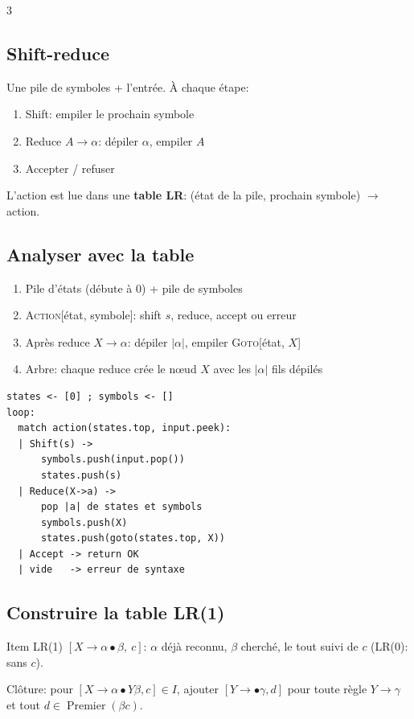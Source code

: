 \documentclass[12pt, a4paper]{article}
\newcommand{\Prem}{\operatorname{Premier}}
\begin{document}
\begin{multicols*}{3}
	\subsection{Shift-reduce}
	Une pile de symboles + l'entrée. À chaque étape:
	\begin{enumerate}[\roman*.]
		\item Shift: empiler le prochain symbole
		\item Reduce $A\rightarrow\alpha$: dépiler $\alpha$, empiler $A$
		\item Accepter / refuser
	\end{enumerate}
	L'action est lue dans une \textbf{table LR}: (état de la pile, prochain symbole) $\rightarrow$ action.
 
	\subsection{Analyser avec la table}
	\begin{enumerate}[\roman*.]
		\item Pile d'états (débute à $0$) + pile de symboles
		\item \textsc{Action}[état, symbole]: shift $s$, reduce, accept ou erreur
		\item Après reduce $X\rightarrow\alpha$: dépiler $|\alpha|$, empiler \textsc{Goto}[état, $X$]
		\item Arbre: chaque reduce crée le nœud $X$ avec les $|\alpha|$ fils dépilés
	\end{enumerate}
	\noindent\begin{minipage}{\linewidth}
		\begin{lstlisting}[style=pseudo]
states <- [0] ; symbols <- []
loop:
  match action(states.top, input.peek):
  | Shift(s) ->
      symbols.push(input.pop())
      states.push(s)
  | Reduce(X->a) ->
      pop |a| de states et symbols
      symbols.push(X)
      states.push(goto(states.top, X))
  | Accept -> return OK
  | vide   -> erreur de syntaxe
\end{lstlisting}
	\end{minipage}
 
  \colbreak
	\subsection{Construire la table LR(1)}
	Item LR(1) $[X\rightarrow\alpha\bullet\beta,\ c]$: $\alpha$ déjà reconnu, $\beta$ cherché, le tout suivi de $c$ (LR(0): sans $c$).
 
	Clôture: pour $[X\rightarrow\alpha\bullet Y\beta,c]\in I$, ajouter $[Y\rightarrow\bullet\gamma,d]$ pour toute règle $Y\rightarrow\gamma$ et tout $d\in\Prem(\beta c)$.
 

\end{multicols*}
\end{document}
